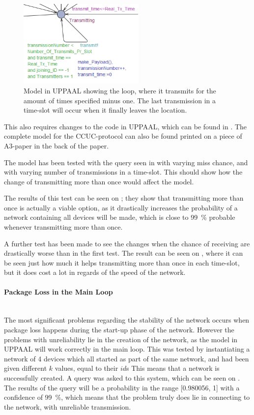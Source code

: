 \begin{figure}
\vspace{12pt}
\centering
  \includegraphics[width=0.55\textwidth]{Figures/Model/Transmit_Loop.PNG} 
\caption{Model in UPPAAL showing the loop, where it transmits for the amount of times specified minus one. The last transmission in a time-slot will occur when it finally leaves the location.}
\label{LoopTransmitUPPAAL}
\end{figure}

This also requires changes to the code in UPPAAL, which can be found in .
The complete model for the CCUC-protocol can also be found printed on a piece of A3-paper in the back of the paper.

The model has been tested with the query seen in  with varying miss chance, and with varying number of transmissions in a time-slot.
This should show how the change of transmitting more than once would affect the model.

The results of this test can be seen on ; they show that transmitting more than once is actually a viable option, as it drastically increases the probability of a network containing all devices will be made, which is close to 99~\% probable whenever transmitting more than once.

A further test has been made to see the changes when the chance of receiving are drastically worse than in the first test.
The result can be seen on , where it can be seen just how much it helps transmitting more than once in each time-slot, but it does cost a lot in regards of the speed of the network.

\paragraph{Package Loss in the Main Loop}\hfill \\
The most significant problems regarding the stability of the network occurs when package loss happens during the start-up phase of the network.
However the problems with unreliability lie in the creation of the network, as the model in UPPAAL will work correctly in the main loop.
This was tested by instantiating a network of 4 devices which all started as part of the same network, and had been given different $k$ values, equal to their $id$s
This means that a network is successfully created.
A query was asked to this system, which can be seen on .
The results of the query will be a probability in the range [0.980056, 1] with a confidence of 99~\%, which means that the problem truly does lie in connecting to the network, with unreliable transmission. 

